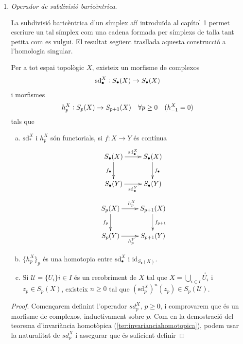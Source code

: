 \documentclass[../main.tex]{subfiles}
\begin{document}
\begin{enumerate}
    \item \textit{Operador de subdivisió baricèntrica}.
    
    La subdivisió baricèntrica d'un símplex afí introduïda al capítol 1 permet escriure un tal símplex com una cadena formada per símplexs de talla tant petita com es vulgui. El resultat següent trasllada aquesta construcció a l'homologia singular.
    
    \begin{prop}
    \label{prop:divisiobaricentrica} Per a tot espai topològic $X$, existeix un morfisme de complexos
    \begin{equation}
    \notag
    \mathrm{sd}_\bullet^X:S_\bullet(X)\rightarrow S_\bullet(X)
    \end{equation}
    i morfismes
    \begin{equation}
    \notag
    h_p^X:S_p(X)\rightarrow S_{p+1}(X)\quad\forall p\geq 0\quad (h_{-1}^X = 0)
    \end{equation}
    tals que
    \begin{enumerate}[(a)]
        \item $\mathrm{sd}_*^X$ i $h_p^X$ són functorials, si $f:X\rightarrow Y$ és contínua
        \begin{equation}
        \notag
        \xymatrix{
        S_\bullet(X)\ar[r]^{\mathrm{sd}_\bullet^X}\ar[d]_{f_\bullet} & S_\bullet(X)\ar[d]^{f_\bullet} \\
        S_\bullet(Y)\ar[r]_{\mathrm{sd}_\bullet^Y} & S_\bullet(Y)
        }
        \end{equation}
        \begin{equation}
        \notag
        \xymatrix{
        S_p(X)\ar[r]^{h_p^X}\ar[d]_{f_p} & S_{p+1}(X)\ar[d]^{f_{p+1}} \\
        S_p(Y)\ar[r]_{h_p^Y} & S_{p+1}(Y)
        }
        \end{equation}
        \item $\{h_p^X\}_p$ és una homotopia entre $\mathrm{sd}_\bullet^X$ i $\mathrm{id}_{S_\bullet(X)}$.
        \item Si $\mathcal{U} = \{U_i\}{i\in I}$ és un recobriment de $X$ tal que $X = \bigcup_{i\in I} \overset{\circ}{U_i}$ i $z_p\in S_p(X)$, existeix $n\geq 0$ tal que $(\mathrm{sd}_p^X)^n(z_p)\in S_p(\mathcal{U})$.
    \end{enumerate}
    \end{prop}
    \begin{proof}
    Començarem definint l'operador $sd_p^X$, $p\geq 0$, i comprovarem que és un morfisme de complexos, inductivament sobre $p$. Com en la demostració del teorema d'invariància homotòpica (\ref{ter:invarianciahomotopica}), podem usar la naturalitat de $sd_p^X$ i assegurar que és suficient definir

\end{proof}
\end{enumerate}
\end{document}
